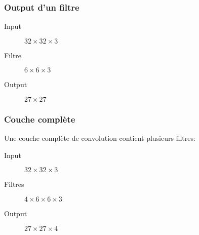 \documentclass{formation}
\begin{document}
\begin{frame}
  \frametitle{Output d'un filtre}
  \begin{figure}
    \centering
    \raisebox{-0.5\height}{\Huge(}
    \raisebox{-0.5\height}{\Huge)}
    \raisebox{-0.5\height}{=}
  \end{figure}
  \begin{description}
  \item[Input] $32 \times 32 \times 3$
  \item[Filtre] $6 \times 6 \times 3$
  \item[Output] $27 \times 27$
  \end{description}
\end{frame}

\begin{frame}
  \frametitle{Couche complète}
  Une couche complète de convolution contient plusieurs filtres:\\
  \begin{figure}
    \centering
    \raisebox{-0.5\height}{\Huge(}
    \raisebox{-0.5\height}{\Huge)}
    \raisebox{-0.5\height}{=}
  \end{figure}
  \begin{description}
  \item[Input] $32 \times 32 \times 3$
  \item[Filtres] $4 \times 6 \times 6 \times 3$
  \item[Output] $27 \times 27 \times 4$
  \end{description}
\end{frame}
\end{document}
